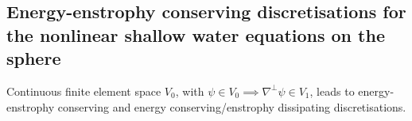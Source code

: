 \documentclass[landscape]{imposter}
\begin{document}
\begin{multicols*}{3}
\section{Energy-enstrophy conserving discretisations for the nonlinear shallow water
  equations on the sphere}

Continuous finite element space $V_0$, with
$\psi \in V_0 \implies \nabla^\perp\psi \in V_1$, \cite{mcrae2014energy}
leads to 
energy-enstrophy conserving and energy conserving/enstrophy dissipating discretisations.
\\ \vspace{1cm}
  \raisebox{5cm}{\parbox{22cm}{
    \texttt{[image: uq\_20\_2]}
    \texttt{[image: uq\_30\_2]}\\
    \texttt{[image: uq\_40\_2]}
    \texttt{[image: uq\_50\_2]}}}
  \hspace{-3cm}


\end{multicols*}
\end{document}
